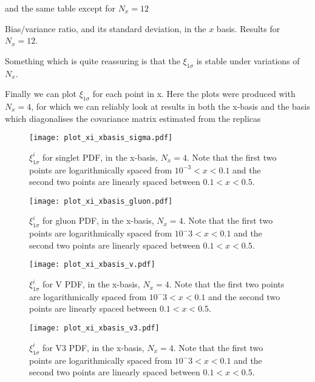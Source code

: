\FloatBarrier

and the same table except for $N_x=12$

\begin{table}[h!]
    \label{tab:xbasis_xi_nx12}
    
    \caption{Bias/variance ratio, and its standard deviation, in the $x$ basis. Results for $N_x=12$. }
\end{table}

\FloatBarrier

Something
which is quite reassuring is that the $\xi_{1\sigma}$ is stable under variations
of $N_x$.

Finally we can plot $\xi_{1\sigma}$ for each point in x. Here the plots were
produced with $N_x=4$, for which we can reliably look at results in both the
x-basis and the basis which diagonalises the covariance matrix estimated
from the replicas

\begin{figure}
    \centering
    \texttt{[image: plot\_xi\_xbasis\_sigma.pdf]}
    \caption{
        $\xi^{i}_{1\sigma}$ for singlet PDF, in the x-basis, $N_x=4$. Note that
        the first two points are logarithmically spaced from $10^{-3} < x < 0.1$
        and the second two points are linearly spaced between $0.1 < x < 0.5$.}
    \label{fig:pdfxisinglet}
\end{figure}

\begin{figure}
    \centering
    \texttt{[image: plot\_xi\_xbasis\_gluon.pdf]}
    \caption{
        $\xi^{i}_{1\sigma}$ for gluon PDF, in the x-basis, $N_x=4$. Note that
        the first two points are logarithmically spaced from $10^-3 < x < 0.1$
        and the second two points are linearly spaced between $0.1 < x < 0.5$.
    }
    \label{fig:pdfxigluon}
\end{figure}

\begin{figure}
    \centering
    \texttt{[image: plot\_xi\_xbasis\_v.pdf]}
    \caption{
        $\xi^{i}_{1\sigma}$ for V PDF, in the x-basis, $N_x=4$. Note that
        the first two points are logarithmically spaced from $10^-3 < x < 0.1$
        and the second two points are linearly spaced between $0.1 < x < 0.5$.
    }
    \label{fig:pdfxiv}
\end{figure}

\begin{figure}
    \centering
    \texttt{[image: plot\_xi\_xbasis\_v3.pdf]}
    \caption{
        $\xi^{i}_{1\sigma}$ for V3 PDF, in the x-basis, $N_x=4$. Note that
        the first two points are logarithmically spaced from $10^-3 < x < 0.1$
        and the second two points are linearly spaced between $0.1 < x < 0.5$.
    }
    \label{fig:pdfxiv3}
\end{figure}

